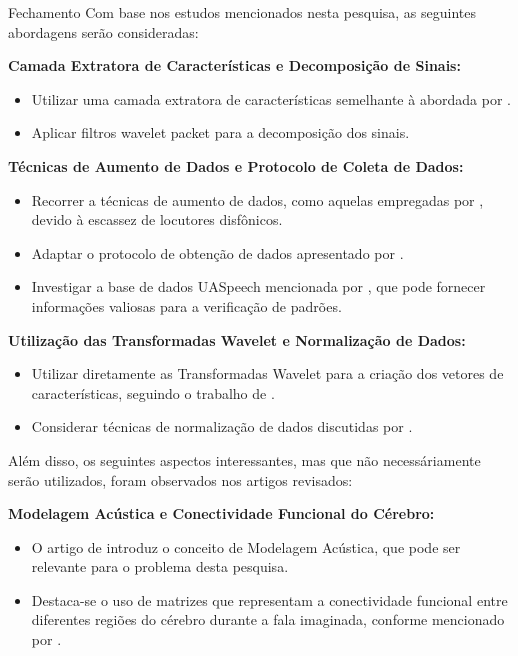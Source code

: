 \documentclass{beamer}
\begin{document}
	\begin{frame}[allowframebreaks]{Fechamento}
		Com base nos estudos mencionados nesta pesquisa, as seguintes abordagens serão consideradas:
		
		\par \textbf{Camada Extratora de Características e Decomposição de Sinais:}
		\begin{itemize}
			\item Utilizar uma camada extratora de características semelhante à abordada por \cite{WOS:000841879504172}.
			\item Aplicar filtros wavelet packet para a decomposição dos sinais.
		\end{itemize}
		
		\par \textbf{Técnicas de Aumento de Dados e Protocolo de Coleta de Dados:}
		\begin{itemize}
			\item Recorrer a técnicas de aumento de dados, como aquelas empregadas por \cite{jin21_interspeech}, devido à escassez de locutores disfônicos.
			\item Adaptar o protocolo de obtenção de dados apresentado por \cite{tamm2020classification}.
			\item Investigar a base de dados UASpeech mencionada por \cite{tamm2020classification}, que pode fornecer informações valiosas para a verificação de padrões.
		\end{itemize}
		
		\framebreak
		
		\par \textbf{Utilização das Transformadas Wavelet e Normalização de Dados:}
		\begin{itemize}
			\item Utilizar diretamente as Transformadas Wavelet para a criação dos vetores de características, seguindo o trabalho de \cite{WOS:000591530700001}.
			\item Considerar técnicas de normalização de dados discutidas por \cite{WOS:000857544900001}.
		\end{itemize}
		
		\framebreak
		
		\par Além disso, os seguintes aspectos interessantes, mas que não necessáriamente serão utilizados, foram observados nos artigos revisados:
		
		\par \textbf{Modelagem Acústica e Conectividade Funcional do Cérebro:}
		\begin{itemize}
			\item O artigo de \cite{6296526} introduz o conceito de Modelagem Acústica, que pode ser relevante para o problema desta pesquisa.
			\item Destaca-se o uso de matrizes que representam a conectividade funcional entre diferentes regiões do cérebro durante a fala imaginada, conforme mencionado por \cite{bakhshali2022investigating}.
		\end{itemize}
		

\end{frame}
\end{document}
